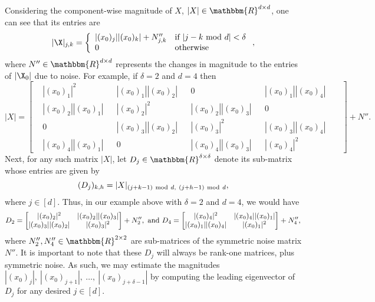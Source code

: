 Considering the component-wise magnitude of $X$, $|X| \in \mathbbm{R}^{d \times d}$, one can see that its entries are 
\begin{equation*}
|\X|_{j,k} =  \left\{ \begin{array}{ll} |({x}_0)_j| |({x}_0)_{k}| + N''_{j,k} & \textrm{if}~| j - k ~{\rm mod}~d | < \delta \\ 0 & \textrm{otherwise} \end{array} \right.,
\end{equation*}
where $N'' \in \mathbbm{R}^{d \times d}$ represents the changes in magnitude to the entries of $|\X_0|$ due to noise.  For example, if $\delta = 2$ and $d = 4$ then
\[ |X| = \begin{bmatrix}
    & |(x_0)_1|^2 & &
    |(x_0)_1||(x_0)_2| & & 
    0 & &
    |(x_0)_1||(x_0)_4| & \\
    & 
    |(x_0)_2||(x_0)_1| & &
    |(x_0)_2|^2 & &
    |(x_0)_2||(x_0)_3| & &
    0 & \\
    & 0 & & 
    |(x_0)_3||(x_0)_2| & &
    |(x_0)_3|^2 & &
    |(x_0)_3||(x_0)_4| & & \\
    & |(x_0)_4||(x_0)_1| & &
    0 &  &
    |(x_0)_4||(x_0)_3| & &
    |(x_0)_4|^2 &
\end{bmatrix} + N''.    \]
Next, for any such matrix $|X|$, let $D_j \in \mathbbm{R}^{\delta \times \delta}$ denote its sub-matrix whose entries are given by 
$$(D_j)_{k,h} = |X|_{(j+k-1)~{\rm mod}~d,~(j+h-1)~{\rm mod}~d},$$
where $j \in [d]$.  Thus, in our example above with $\delta = 2$ and $d = 4$, we would have
\[ D_2 = \begin{bmatrix}
    |(x_0)_2|^2 & |(x_0)_2||(x_0)_3| \\
    |(x_0)_3||(x_0)_2| & |(x_0)_3|^2 
\end{bmatrix} + N_2'', ~{\rm and}~D_4 = \begin{bmatrix}
    |(x_0)_4|^2 & |(x_0)_4||(x_0)_1| \\
    |(x_0)_1||(x_0)_4|&  |(x_0)_1|^2 
    \end{bmatrix} + N''_4,
\]
where $N''_2, N''_4 \in \mathbbm{R}^{2 \times 2}$ are sub-matrices of the symmetric noise matrix $N''$.  It is important to note that these $D_j$ will always be rank-one matrices, plus symmetric noise.  As such, we may estimate the magnitudes $|(x_0)_j|, ~|(x_0)_{j+1}|,~ \dots,~ |(x_0)_{j+\delta-1}|$ by computing the leading eigenvector of $D_j$ for any desired $j \in [d]$.


